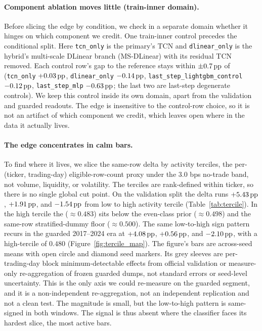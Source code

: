 \paragraph{Component ablation moves little (train-inner domain).}
Before slicing the edge by condition, we check in a separate domain whether it
hinges on which component we credit. One train-inner control precedes the
conditional split. Here \texttt{tcn\_only}
is the primary's TCN and \texttt{dlinear\_only} is the hybrid's multi-scale
DLinear branch (MS-DLinear) with its residual TCN removed. Each control row's gap
to the reference stays within $\pm0.7\,\textrm{pp}$ of \macrofone{} (\texttt{tcn\_only}
$+0.03\,\textrm{pp}$, \texttt{dlinear\_only} $-0.14\,\textrm{pp}$,
\texttt{last\_step\_lightgbm\_control} $-0.12\,\textrm{pp}$, \texttt{last\_step\_mlp}
$-0.63\,\textrm{pp}$; the last two are last-step degenerate controls). We keep this control
inside its own domain, apart from the validation and guarded readouts. The edge is
insensitive to the control-row choice, so it is not an artifact of which component
we credit, which leaves open where in the data it actually lives.

\paragraph{The edge concentrates in calm bars.}
To find where it lives, we slice the same-row \macrofone{} delta by activity
terciles, the per-(ticker, trading-day) eligible-row-count proxy under the
$3.0$ bps no-trade band, not volume, liquidity, or volatility. The terciles are rank-defined within
ticker, so there is no single global cut point. On the validation split the delta
runs $+5.43\,\textrm{pp}$, $+1.91\,\textrm{pp}$, and $-1.54\,\textrm{pp}$ from low to high activity tercile
(Table~\ref{tab:tercile}). In the high tercile the \macrofone{}
($\approx 0.483$) sits below the even-class prior ($\approx 0.498$) and the
same-row stratified-dummy floor ($\approx 0.500$). The same low-to-high sign
pattern recurs in the guarded 2017--2024 era at $+4.08\,\textrm{pp}$, $+0.56\,\textrm{pp}$, and
$-2.10\,\textrm{pp}$, with a high-tercile \macrofone{} of $0.480$
(Figure~\ref{fig:tercile_map}). The figure's bars are across-seed means with open
circle and diamond seed markers. Its grey sleeves are per-trading-day block
minimum-detectable effects from official validation or measure-only
re-aggregation of frozen guarded dumps, not standard errors or seed-level
uncertainty. This is the only axis we could re-measure on the guarded segment, and
it is a non-independent re-aggregation, not an independent replication and not a clean test. The
magnitude is small, but the low-to-high pattern is same-signed in both windows.
The signal is thus absent where the classifier faces its hardest slice, the most
active bars.


